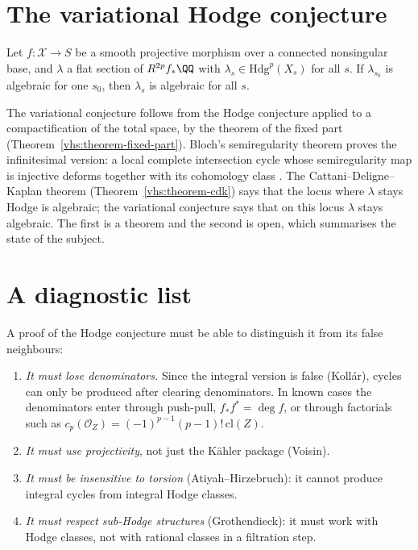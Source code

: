 \section{The variational Hodge conjecture}\label{known-cases:section-variational}

\begin{conjecture}\label{known-cases:conjecture-variational}
Let $f \colon \mathcal{X} \to S$ be a smooth projective morphism over a connected nonsingular base, and $\lambda$ a flat section of $R^{2p}f_*\QQ$ with $\lambda_s \in \mathrm{Hdg}^p(X_s)$ for all $s$. If $\lambda_{s_0}$ is
algebraic for one $s_0$, then $\lambda_s$ is algebraic for all $s$.
\end{conjecture}

\begin{remark}\label{known-cases:remark-variational}
The variational conjecture follows from the Hodge conjecture applied to a compactification of the total space, by the theorem of the fixed part (Theorem~\ref{vhs:theorem-fixed-part}). Bloch's
semiregularity theorem proves the infinitesimal version: a local complete intersection cycle whose semiregularity map is injective deforms together with its cohomology class
\cite{bloch-1972}. The Cattani--Deligne--Kaplan theorem (Theorem~\ref{vhs:theorem-cdk}) says that the locus where $\lambda$ stays Hodge is algebraic; the variational conjecture says that on this locus
$\lambda$ stays algebraic. The first is a theorem and the second is open, which summarises the state of the subject.
\end{remark}

\section{A diagnostic list}\label{known-cases:section-diagnostic}

\begin{remark}\label{known-cases:remark-diagnostic}
A proof of the Hodge conjecture must be able to distinguish it from its false neighbours:
\begin{enumerate}
\item \emph{It must lose denominators.} Since the integral version is false (Koll\'ar), cycles can only be produced after clearing denominators. In known cases the denominators enter through
push-pull, $f_*f^* = \deg f$, or through factorials such as $c_p(\mathcal{O}_Z) = (-1)^{p-1}(p-1)!\,\mathrm{cl}(Z)$.
\item \emph{It must use projectivity}, not just the K\"ahler package (Voisin).
\item \emph{It must be insensitive to torsion} (Atiyah--Hirzebruch): it cannot produce integral cycles from integral Hodge classes.
\item \emph{It must respect sub-Hodge structures} (Grothendieck): it must work with Hodge classes, not with rational classes in a filtration step.
\end{enumerate}
\end{remark}

